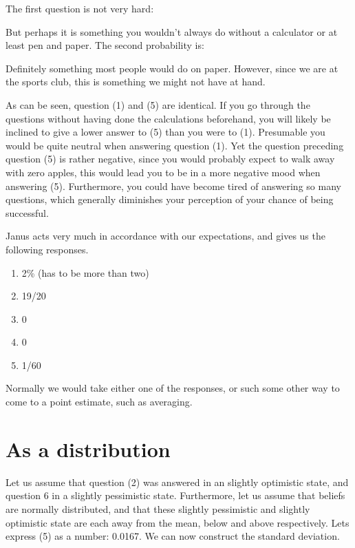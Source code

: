 \documentclass[draft.tex]{subfiles}
\begin{document}
The first question is not very hard:


But perhaps it is something you wouldn't always do without a calculator
or at least pen and paper. The second probability is:

Definitely something most people would do on paper. However, since we
are at the sports club, this is something we might not have at hand.

As can be seen, question (1) and (5) are identical. If you go through
the questions without having done the calculations beforehand, you will
likely be inclined to give a lower answer to (5) than you were to (1).
Presumable you would be quite neutral when answering question (1). Yet
the question preceding question (5) is rather negative, since you would
probably expect to walk away with zero apples, this would lead you to be
in a more negative mood when answering (5). Furthermore, you could have
become tired of answering so many questions, which generally diminishes
your perception of your chance of being successful.

Janus acts very much in accordance with our expectations, and gives us
the following responses.

\begin{enumerate}
\def\labelenumi{\arabic{enumi}.}
\itemsep1pt\parskip0pt
\item
  2\% (has to be more than two)
\item
  19/20
\item
  0
\item
  0
\item
  1/60
\end{enumerate}

Normally we would take either one of the responses, or such some other
way to come to a point estimate, such as averaging.

\section{As a distribution}

Let us assume that question (2) was answered in an slightly optimistic
state, and question 6 in a slightly pessimistic state. Furthermore, let
us assume that beliefs are normally distributed, and that these slightly
pessimistic and slightly optimistic state are each away from the mean,
below and above respectively. Lets express (5) as a number: 0.0167. We
can now construct the standard deviation.
\end{document}
